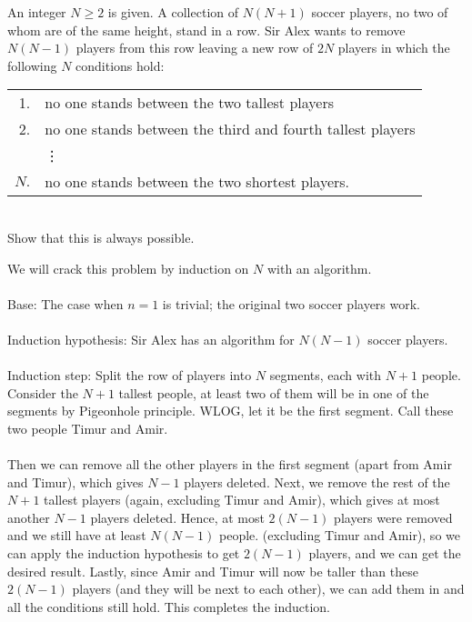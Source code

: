 \begin{example} [IMO 2017]
    An integer $N \ge 2$ is given. A collection of $N(N + 1)$ soccer players, no two of whom are of the same height, stand in a row. Sir Alex wants to remove $N(N - 1)$ players from this row leaving a new row of $2N$ players in which the following $N$ conditions hold:\\
    \begin{tabular}{rl}
        1.& no one stands between the two tallest players\\
        2.& no one stands between the third and fourth tallest players\\
        &\vdots\\
        $N.$& no one stands between the two shortest players.
    \end{tabular}\\
    Show that this is always possible.
\end{example}

\sol We will crack this problem by induction on $N$ with an algorithm.
\\\\
Base: The case when $n = 1$ is trivial; the original two soccer players work. 
\\\\
Induction hypothesis: Sir Alex has an algorithm for $N(N-1)$ soccer players. 
\\\\
Induction step:  Split the row of players into $N$ segments, each with $N+1$ people. Consider the $N+1$ tallest people, at least two of them will be in one of the segments by Pigeonhole principle. WLOG, let it be the first segment. Call these two people Timur and Amir.
\\\\
Then we can remove all the other players in the first segment (apart from Amir and Timur), which gives $N-1$ players deleted. Next, we remove the rest of the $N+1$ tallest players (again, excluding Timur and Amir), which gives at most another $N-1$ players deleted. Hence, at most $2(N-1)$ players were removed and we still have at least $N(N-1)$ people. (excluding Timur and Amir), so we can apply the induction hypothesis to get $2(N-1)$ players, and we can get the desired result. Lastly, since Amir and Timur will now be taller than these $2(N-1)$ players (and they will be next to each other), we can add them in and all the conditions still hold. This completes the induction.

\newpage

